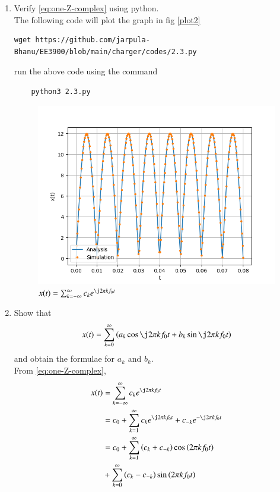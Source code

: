\documentclass[journal,12pt,twocolumn]{IEEEtran}
\renewcommand\thesection{\arabic{section}}
\begin{document}
\begin{enumerate}[label=\thesection.\arabic*,ref=\thesection.\theenumi]
	\item Verify 
	\eqref{eq:one-Z-complex}
	using python.\\
	\solution The following code will plot the graph in fig \eqref{plot2}
	\begin{lstlisting}
wget https://github.com/jarpula-Bhanu/EE3900/blob/main/charger/codes/2.3.py
	\end{lstlisting}
	run the above code using the command
	\begin{lstlisting}
	python3 2.3.py
	\end{lstlisting}
	\begin{figure}[!ht]
		\includegraphics[width=\columnwidth]{./figs/2.3.png}
		\caption{$x(t) = \sum_{k = -\infty}^{\infty}c_ke^{\j2\pi kf_0 t}$}
		\label{plot2}
	\end{figure}
	\item Show that 
	\begin{align}
		x(t) = \sum_{k = 0}^{\infty}\brak{a_k\cos{\j2\pi kf_0 t}+b_k\sin{\j2\pi kf_0 t}}
		\label{eq:one-Z-real}
	\end{align}
	and obtain the formulae for $a_k$ and $b_k$.\\
	\solution From \eqref{eq:one-Z-complex},
	\begin{align}
		x(t) &= \sum_{k = -\infty}^{\infty}c_ke^{\j2\pi kf_0 t} \\
		&= c_0 + \sum_{k = 1}^{\infty}c_ke^{\j2\pi kf_0t} + c_{-k}e^{-\j2\pi kf_0t} \\
		&= c_0 + \sum_{k = 1}^{\infty}\brak{c_k + c_{-k}}\cos\brak{2\pi kf_0t}  \nonumber \\
		&+ \sum_{k = 0}^{\infty}\brak{c_k - c_{-k}}\sin\brak{2\pi kf_0t}

\end{align}
\end{enumerate}
\end{document}

